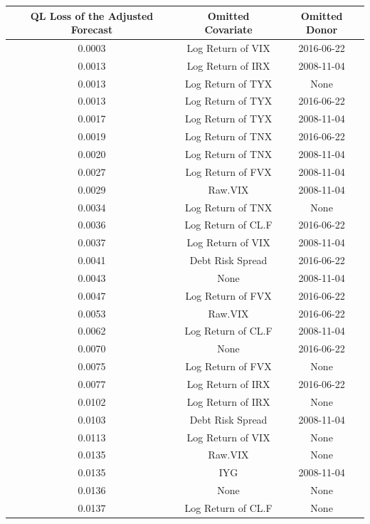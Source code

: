 \documentclass[11pt,3p,review,authoryear]{elsarticle}
\theoremstyle{definition}
\begin{document}
\begin{table}[ht]
  \centering
   \label{tab:title} 
  \begingroup\fontsize{7pt}{8pt}\selectfont
  \begin{tabular}{ccc}
    
    \hline
 QL Loss of the Adjusted Forecast& Omitted Covariate & Omitted Donor \\ 
    \hline
    0.0003 & Log Return of VIX & 2016-06-22 \\ 
    0.0013 & Log Return of IRX & 2008-11-04 \\ 
    0.0013 & Log Return of TYX & None \\ 
    0.0013 & Log Return of TYX & 2016-06-22 \\ 
    0.0017 & Log Return of TYX & 2008-11-04 \\ 
    0.0019 & Log Return of TNX & 2016-06-22 \\ 
    0.0020 & Log Return of TNX & 2008-11-04 \\ 
    0.0027 & Log Return of FVX & 2008-11-04 \\ 
    0.0029 & Raw.VIX & 2008-11-04 \\ 
    0.0034 & Log Return of TNX & None \\ 
    0.0036 & Log Return of CL.F & 2016-06-22 \\ 
    0.0037 & Log Return of VIX & 2008-11-04 \\ 
    0.0041 & Debt Risk Spread & 2016-06-22 \\ 
    0.0043 & None & 2008-11-04 \\ 
    0.0047 & Log Return of FVX & 2016-06-22 \\ 
    0.0053 & Raw.VIX & 2016-06-22 \\ 
    0.0062 & Log Return of CL.F & 2008-11-04 \\ 
    0.0070 & None & 2016-06-22 \\ 
    0.0075 & Log Return of FVX & None \\ 
    0.0077 & Log Return of IRX & 2016-06-22 \\ 
    0.0102 & Log Return of IRX & None \\ 
    0.0103 & Debt Risk Spread & 2008-11-04 \\ 
    0.0113 & Log Return of VIX & None \\ 
    0.0135 & Raw.VIX & None \\ 
    0.0135 & IYG & 2008-11-04 \\ 
    0.0136 & None & None \\ 
    0.0137 & Log Return of CL.F & None \\ 

\end{tabular}
\end{table}
\end{document}
